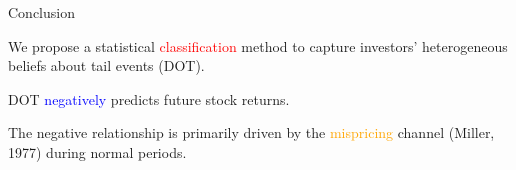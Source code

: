 \documentclass[11pt, aspectratio=169]{beamer}
\newenvironment{wideitemize}{\itemize\addtolength{\itemsep}{10pt}}{\enditemize}
\begin{document}
\begin{frame}{Conclusion}
\begin{wideitemize}
    \item We propose a statistical \textcolor{red}{classification} method to capture investors' heterogeneous beliefs about tail events (DOT).
    \item DOT \textcolor{blue}{negatively} predicts future stock returns.
    \item The negative relationship is primarily driven by the \textcolor{orange}{mispricing} channel (Miller, 1977) during normal periods.
\end{wideitemize}
\end{frame}
\end{document}
